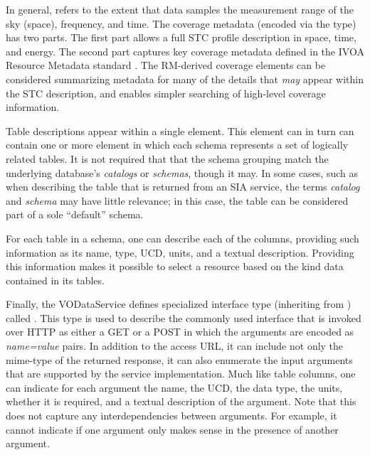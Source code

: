 \documentclass[11pt,a4paper]{ivoa}
\begin{document}
In general,  refers to
the extent that data samples the measurement range of the sky (space),
frequency, and time.  The coverage metadata (encoded via the
 type) has two parts.  The first part
allows a full STC profile description in space, time, and energy.
The second part
captures key coverage metadata defined in the IVOA Resource Metadata
standard \citep{2007ivoa.spec.0302H}.  The RM-derived coverage elements can
be considered summarizing metadata for many of the details that
\emph{may} appear within the STC description, and enables simpler
searching of high-level coverage information.




Table descriptions appear within a single 
element.  This element can in turn can contain one or more
 element in which each schema
represents a set of logically related tables.  It is not required that 
that the schema grouping match the underlying database's
\emph{catalogs} or \emph{schemas}, though it may.  In some cases,
such as when describing the table that is returned from an SIA
service, the terms \emph{catalog} and \emph{schema} may have
little relevance; in this case, the table can be considered part of a
sole ``default'' schema.  



For each table in a schema, one can describe each of the columns,
providing such information as its name, type, UCD,
units, and a textual description.  Providing this information makes it
possible to select a resource based on the kind data contained in its
tables.  



Finally, the VODataService defines specialized interface type
(inheriting from ) called
.  This type is used to describe the commonly
used interface that is invoked over HTTP as either a GET or a POST 
in which the arguments are encoded as
\emph{name=value} pairs.  In addition to the access URL, it can
include not only the mime-type of the returned response, it can also
enumerate the input arguments that are supported by the service
implementation.  Much like table columns, one can indicate for each
argument the name, the UCD, the data type, the units, whether it is
required, and a textual description of the argument.  Note that this does
not capture any interdependencies between arguments.  For example, it
cannot indicate if one argument only makes sense in the presence of
another argument.  
\end{document}
